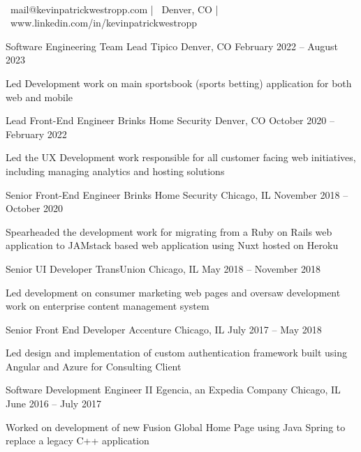 \documentclass[]{awesome-cv}
\begin{document}
    
\begin{center}
	  \\
	\vspace{2mm}
	{\faEnvelope\ mail@kevinpatrickwestropp.com} | {\faMapMarker\ Denver, CO} | {\faLink\ www.linkedin.com/in/kevinpatrickwestropp}
\end{center}
\begin{cventries}
	\cventry
	{Software Engineering Team Lead}
	{Tipico}
	{Denver, CO}
	{February 2022 – August 2023}
	{\begin{cvitems}
		\item {Led Development work on main sportsbook (sports betting) application for both web and mobile}
		\end{cvitems}}
	\cventry
	{Lead Front-End Engineer}
	{Brinks Home Security}
	{Denver, CO}
	{October 2020 – February 2022}
	{\begin{cvitems}
		\item {Led the UX Development work responsible for all customer facing web initiatives, including managing analytics and hosting solutions}
		\end{cvitems}}
	\cventry
	{Senior Front-End Engineer}
	{Brinks Home Security}
	{Chicago, IL}
	{November 2018 – October 2020}
	{\begin{cvitems}
		\item {Spearheaded the development work for migrating from a Ruby on Rails web application to JAMstack based web application using Nuxt hosted on Heroku}
		\end{cvitems}}
	\cventry
	{Senior UI Developer}
	{TransUnion}
	{Chicago, IL}
	{May 2018 – November 2018}
	{\begin{cvitems}
		\item {Led development on consumer marketing web pages and oversaw development work on enterprise content management system}
		\end{cvitems}}
	\cventry
	{Senior Front End Developer}
	{Accenture}
	{Chicago, IL}
	{July 2017 – May 2018}
	{\begin{cvitems}
		\item {Led design and implementation of custom authentication framework built using Angular and Azure for Consulting Client}
		\end{cvitems}}
	\cventry
	{Software Development Engineer II}
	{Egencia, an Expedia Company}
	{Chicago, IL}
	{June 2016 – July 2017}
	{\begin{cvitems}
		\item {Worked on development of new Fusion Global Home Page using Java Spring to replace a legacy C++ application}
		\end{cvitems}}
\end{cventries}
\end{document}
